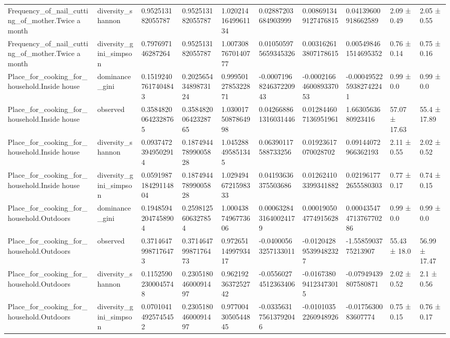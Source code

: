 \begin{longtable}{llllllllll}
Frequency\_of\_nail\_cutting\_of\_mother.Twice a month & diversity\_shannon & 0.952513182055787 & 0.952513182055787 & 1.0202141649961134 & 0.02887203684903999 & 0.008691349127476815 & 0.04139600918662589 & 2.09 ± 0.49 & 2.05 ± 0.55 \\
Frequency\_of\_nail\_cutting\_of\_mother.Twice a month & diversity\_gini\_simpson & 0.797697146287264 & 0.952513182055787 & 1.0073087670140777 & 0.010505975659345326 & 0.003162613807178615 & 0.005498461514695352 & 0.76 ± 0.14 & 0.75 ± 0.16 \\
Place\_for\_cooking\_for\_household.Inside house & dominance\_gini & 0.15192407617404843 & 0.20256543489873124 & 0.9995012785322871 & -0.0007196824637220943 & -0.0002166460089337053 & -0.0004952259382742241 & 0.99 ± 0.0 & 0.99 ± 0.0 \\
Place\_for\_cooking\_for\_household.Inside house & observed & 0.35848200642328765 & 0.35848200642328765 & 1.0300175087864998 & 0.042668861316031446 & 0.012844607136951961 & 1.6630563680923416 & 57.07 ± 17.63 & 55.4 ± 17.89 \\
Place\_for\_cooking\_for\_household.Inside house & diversity\_shannon & 0.09374723949502914 & 0.18749447899005828 & 1.045288495851345 & 0.06390117588733256 & 0.01923617070028702 & 0.09144072966362193 & 2.11 ± 0.55 & 2.02 ± 0.52 \\
Place\_for\_cooking\_for\_household.Inside house & diversity\_gini\_simpson & 0.059198718429114804 & 0.18749447899005828 & 1.0294946721598333 & 0.04193636375503686 & 0.012624103399341882 & 0.021961772655580303 & 0.77 ± 0.17 & 0.74 ± 0.15 \\
Place\_for\_cooking\_for\_household.Outdoors & dominance\_gini & 0.19485942047458904 & 0.2598125606327854 & 1.0004387496773606 & 0.0006328431640024179 & 0.000190504774915628 & 0.00043547471376770286 & 0.99 ± 0.0 & 0.99 ± 0.0 \\
Place\_for\_cooking\_for\_household.Outdoors & observed & 0.37146479987176473 & 0.37146479987176473 & 0.9726511499793417 & -0.04000563257133011 & -0.012042895399482327 & -1.5585903775213907 & 55.43 ± 18.0 & 56.99 ± 17.47 \\
Place\_for\_cooking\_for\_household.Outdoors & diversity\_shannon & 0.11525902300045748 & 0.23051804600091497 & 0.9621923637252742 & -0.05560274512363406 & -0.016738094123473015 & -0.07949439807580871 & 2.02 ± 0.52 & 2.1 ± 0.56 \\
Place\_for\_cooking\_for\_household.Outdoors & diversity\_gini\_simpson & 0.07010414925745452 & 0.23051804600091497 & 0.9770043050544845 & -0.033563175613792046 & -0.01010352260948926 & -0.0175630083607774 & 0.75 ± 0.15 & 0.76 ± 0.17 \\

\end{longtable}
